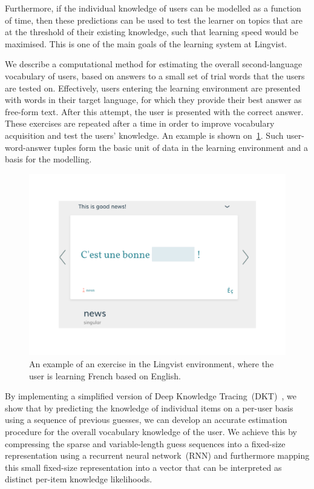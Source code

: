 Furthermore, if the individual knowledge of users can be modelled as a function of time, then these predictions can be used to test the learner on topics that are at the threshold of their existing knowledge, such that learning speed would be maximised. This is one of the main goals of the learning system at Lingvist.

We describe a computational method for estimating the overall second-language vocabulary of users, based on answers to a small set of trial words that the users are tested on. Effectively, users entering the learning environment are presented with words in their target language, for which they provide their best answer as free-form text. After this attempt, the user is presented with the correct answer. These exercises are repeated after a time in order to improve vocabulary acquisition and test the users' knowledge. An example is shown on~\cref{fig:lu_example}. Such user-word-answer tuples form the basic unit of data in the learning environment and a basis for the modelling.

\begin{figure}
\centering
\includegraphics[width=0.6\linewidth]{figures/lingvist/example_lu.pdf}
\caption[An example exercise in the Lingvist environment]{An example of an exercise in the Lingvist environment, where the user is learning French based on English.} 
\label{fig:lu_example} 
\end{figure} 

By implementing a simplified version of Deep Knowledge Tracing~(DKT)~\cite{DBLP:journals/corr/PiechSHGSGS15}, we show that by predicting the knowledge of individual items on a per-user basis using a sequence of previous guesses, we can develop an accurate estimation procedure for the overall vocabulary knowledge of the user. We achieve this by compressing the sparse and variable-length guess sequences into a fixed-size representation using a recurrent neural network~(RNN) and furthermore mapping this small fixed-size representation into a vector that can be interpreted as distinct per-item knowledge likelihoods.

